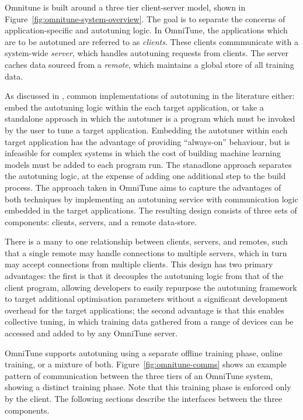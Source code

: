Omnitune is built around a three tier client-server model, shown in
Figure~\ref{fig:omnitune-system-overview}. The goal is to separate the
concerns of application-specific and autotuning logic. In OmniTune,
the applications which are to be autotuned are referred to as
\emph{clients}. These clients commmunicate with a system-wide
\emph{server}, which handles autotuning requests from clients. The
server caches data sourced from a \emph{remote}, which maintains a
global store of all training data.

As discussed in , common implementations of
autotuning in the literature either: embed the autotuning logic within
the each target application, or take a standalone approach in which
the autotuner is a program which must be invoked by the user to tune a
target application. Embedding the autotuner within each target
application has the advantage of providing ``always-on'' behaviour,
but is infeasible for complex systems in which the cost of building
machine learning models must be added to each program run. The
stanadlone approach separates the autotuning logic, at the expense of
adding one additional step to the build process. The approach taken in
OmniTune aims to capture the advantages of both techniques by
implementing an autotuning service with communication logic embedded
in the target applications. The resulting design consists of three
sets of components: clients, servers, and a remote data-store.

There is a many to one relationship between clients, servers, and
remotes, such that a single remote may handle connections to multiple
servers, which in turn may accept connections from multiple
clients. This design has two primary advantages: the first is that it
decouples the autotuning logic from that of the client program,
allowing developers to easily repurpose the autotuning framework to
target additional optimisation parameters without a significant
development overhead for the target applications; the second advantage
is that this enables collective tuning, in which training data
gathered from a range of devices can be accessed and added to by any
OmniTune server.

OmniTune supports autotuning using a separate offline training phase,
online training, or a mixture of both. Figure~\ref{fig:omnitune-comms}
shows an example pattern of communication between the three tiers of
an OmniTune system, showing a distinct training phase. Note that this
training phase is enforced only by the client. The following sections
describe the interfaces between the three components.



